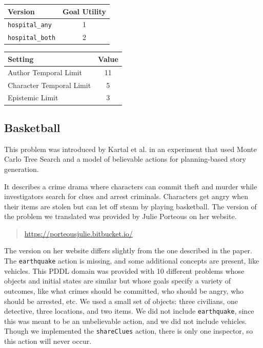 \documentclass{nilreport}
\makeatletter
\renewcommand{\bibentry}[1]{\nocite{#1}{\frenchspacing\@nameuse{BR@r@#1\@extra@b@citeb}}}
\makeatother
\begin{document}
\medskip{}

\begin{center}
\begin{tabular}[t]{|l|c|}
\hline 
\textbf{Version} & \textbf{Goal Utility}\tabularnewline
\hline 
\hline 
\texttt{hospital\_any} & 1\tabularnewline
\hline 
\texttt{hospital\_both} & 2\tabularnewline
\hline 
\end{tabular}\textbf{\quad{}}%
\begin{tabular}[t]{|l|c|}
\hline 
\textbf{Setting} & \textbf{Value}\tabularnewline
\hline 
\hline 
Author Temporal Limit & 11\tabularnewline
\hline 
Character Temporal Limit & 5\tabularnewline
\hline 
Epistemic Limit & 3\tabularnewline
\hline 
\end{tabular}
\par\end{center}

\subsection{Basketball}

This problem was introduced by Kartal et al. in an experiment that
used Monte Carlo Tree Search and a model of believable actions for
planning-based story generation.

\begin{quote}
	\bibentry{kartal2014user}
\end{quote}

\noindent It describes a crime drama where characters can commit theft
and murder while investigators search for clues and arrest criminals.
Characters get angry when their items are stolen but can let off steam
by playing basketball. The version of the problem we translated was
provided by Julie Porteous on her website.

\begin{quote}
	\url{https://porteousjulie.bitbucket.io/}
\end{quote}

\noindent The version on her website differs slightly from the one
described in the paper. The \texttt{earthquake} action is missing,
and some additional concepts are present, like vehicles. This PDDL
domain was provided with 10 different problems whose objects and initial
states are similar but whose goals specify a variety of outcomes,
like what crimes should be committed, who should be angry, who should
be arrested, etc. We used a small set of objects: three civilians,
one detective, three locations, and two items. We did not include
\texttt{earthquake}, since this was meant to be an unbelievable action,
and we did not include vehicles. Though we implemented the \texttt{shareClues}
action, there is only one inspector, so this action will never occur.
\end{document}
